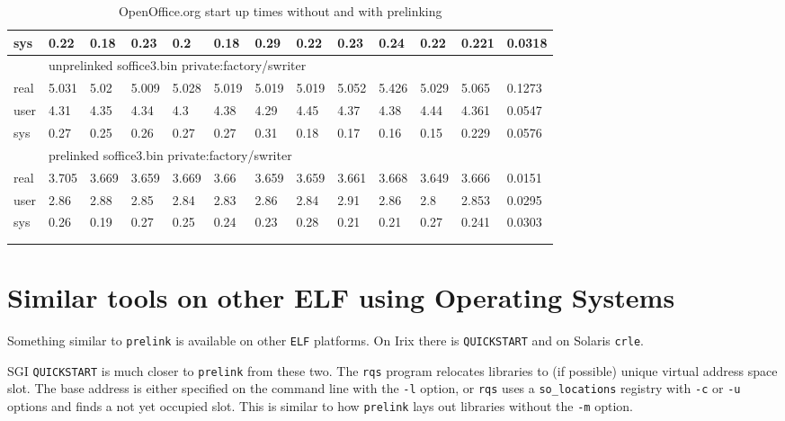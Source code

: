 \documentclass[twoside]{article}
\def\tts#1{\texttt{\small #1}}
\begin{document}
{\begin{center}
\begin{longtable}{l|llllllllll|ll}
{sys} & {0.22} & {0.18} & {0.23} & {0.2} & {0.18} & {0.29} & {0.22} & {0.23} & {0.24} & {0.22} & {0.221} & {0.0318} \\
\hline
& \multicolumn{10}{l|}{unprelinked soffice3.bin private:factory/swriter} && \\
\hline
{real} & {5.031} & {5.02} & {5.009} & {5.028} & {5.019} & {5.019} & {5.019} & {5.052} & {5.426} & {5.029} & {5.065} & {0.1273} \\
{user} & {4.31} & {4.35} & {4.34} & {4.3} & {4.38} & {4.29} & {4.45} & {4.37} & {4.38} & {4.44} & {4.361} & {0.0547} \\
{sys} & {0.27} & {0.25} & {0.26} & {0.27} & {0.27} & {0.31} & {0.18} & {0.17} & {0.16} & {0.15} & {0.229} & {0.0576} \\
\hline
& \multicolumn{10}{l|}{prelinked soffice3.bin private:factory/swriter} && \\
\hline
{real} & {3.705} & {3.669} & {3.659} & {3.669} & {3.66} & {3.659} & {3.659} & {3.661} & {3.668} & {3.649} & {3.666} & {0.0151} \\
{user} & {2.86} & {2.88} & {2.85} & {2.84} & {2.83} & {2.86} & {2.84} & {2.91} & {2.86} & {2.8} & {2.853} & {0.0295} \\
{sys} & {0.26} & {0.19} & {0.27} & {0.25} & {0.24} & {0.23} & {0.28} & {0.21} & {0.21} & {0.27} & {0.241} & {0.0303} \\
\hline
\multicolumn{13}{l}{} \\
\caption{OpenOffice.org start up times without and with prelinking} \\
\end{longtable}
\end{center}}

\section{Similar tools on other ELF using Operating Systems}

Something similar to \tts{prelink} is available on other \tts{ELF}
platforms.  On Irix there is \tts{QUICKSTART} and on Solaris \tts{crle}.

SGI \tts{QUICKSTART} is much closer to \tts{prelink} from these two.
The \tts{rqs} program relocates libraries to (if possible) unique
virtual address space slot.  The base address is either specified
on the command line with the \tts{-l} option, or \tts{rqs} uses
a \tts{so\_locations} registry with \tts{-c} or \tts{-u} options
and finds a not yet occupied slot.  This is similar to how \tts{prelink}
lays out libraries without the \tts{-m} option.
\end{document}
